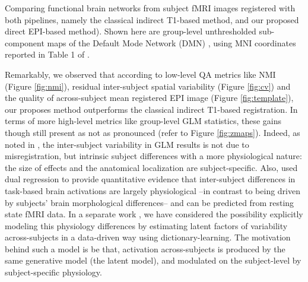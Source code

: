 \begin{marginfigure}
\caption{Comparing functional brain networks from subject fMRI images registered with both pipelines, namely the classical indirect T1-based method, and our proposed direct EPI-based method). Shown here are group-level unthresholded sub-component maps of the Default Mode Network (DMN) \citep{raichle2001}, using MNI coordinates reported in Table 1 of \citep{Watanabe2013}.}
  \label{fig:dmn}
\end{marginfigure}

Remarkably, we observed that according to low-level QA metrics
like NMI (Figure \ref{fig:nmi}), residual inter-subject spatial
variability (Figure \ref{fig:cv}) and the  quality of across-subject mean
registered EPI image (Figure \ref{fig:template}), our proposes method
outperforms the classical indirect T1-based registration.
%
In terms of more high-level metrics like group-level GLM statistics, these gains though still present as not as pronounced (refer to Figure \ref{fig:zmaps}). Indeed, as noted in
\citep{thirion2007analysis,pmid22425669}, the inter-subject variability
in GLM results is not due to misregistration, but intrinsic subject
differences with a more physiological nature: the size of effects and
the anatomical localization are subject-specific. Also, \citep{tavor2016task} used
dual regression \citep{Filippini2009} to provide quantitative evidence that inter-subject
differences in task-based brain activations are largely physiological --in contrast to being driven
by subjects' brain
morphological differences-- and can be predicted from resting state fMRI data.
In a separate work \citep{dohmatob2016}, we have considered the possibility explicitly
modeling this physiology differences by estimating latent
factors of variability across-subjects in a data-driven way using
dictionary-learning. The motivation behind such a model
is be that, activation across-subjects is produced by the same
generative model (the latent model), and modulated on the subject-level by
subject-specific physiology.


